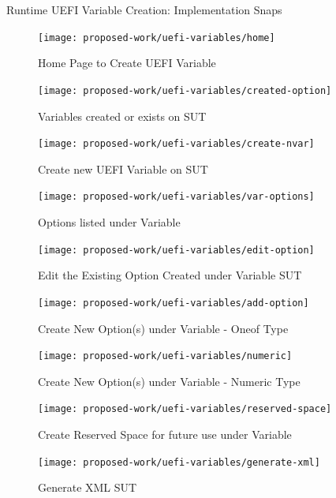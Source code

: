 \begin{frame}[allowframebreaks]{Runtime UEFI Variable Creation: Implementation Snaps}
  \begin{figure}[htbp]
    \centering
    \texttt{[image: proposed-work/uefi-variables/home]}
    \caption{Home Page to Create UEFI Variable}\label{fig:uefi-variable-home}
  \end{figure}

  \begin{figure}[htbp]
    \centering
    \texttt{[image: proposed-work/uefi-variables/created-option]}
    \caption{Variables created or exists on SUT}\label{fig:uefi-variable-created-option}
  \end{figure}
  
  \begin{figure}[htbp]
    \centering
    \texttt{[image: proposed-work/uefi-variables/create-nvar]}
    \caption{Create new UEFI Variable on SUT}\label{fig:uefi-variable-create-nvar}
  \end{figure}
  
  \begin{figure}[htbp]
    \centering
    \texttt{[image: proposed-work/uefi-variables/var-options]}
    \caption{Options listed under Variable}\label{fig:uefi-variable-var-options}
  \end{figure}
  
  \begin{figure}[htbp]
    \centering
    \texttt{[image: proposed-work/uefi-variables/edit-option]}
    \caption{Edit the Existing Option Created under Variable SUT}\label{fig:uefi-variable-edit-option}
  \end{figure}
  
  \begin{figure}[htbp]
    \centering
    \texttt{[image: proposed-work/uefi-variables/add-option]}
    \caption{Create New Option(s) under Variable - Oneof Type}\label{fig:uefi-variable-add-option}
  \end{figure}
  
  \begin{figure}[htbp]
    \centering
    \texttt{[image: proposed-work/uefi-variables/numeric]}
    \caption{Create New Option(s) under Variable - Numeric Type}\label{fig:uefi-variable-numeric}
  \end{figure}
  
  \begin{figure}[htbp]
    \centering
    \texttt{[image: proposed-work/uefi-variables/reserved-space]}
    \caption{Create Reserved Space for future use under Variable}\label{fig:uefi-variable-reserved-space}
  \end{figure}
  
  \begin{figure}[htbp]
    \centering
    \texttt{[image: proposed-work/uefi-variables/generate-xml]}
    \caption{Generate XML SUT}\label{fig:uefi-variable-generate-xml}
  \end{figure}

\end{frame}

